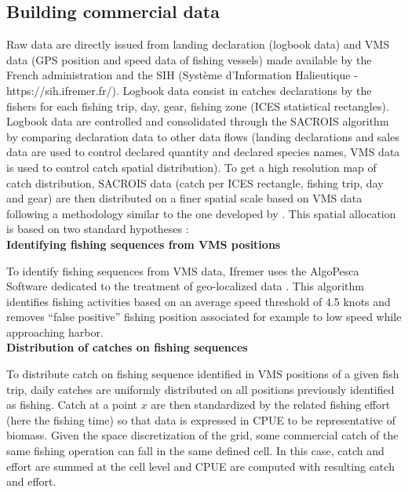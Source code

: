 \clearpage

\subsection{Building commercial data}\label{appendix:DataProcess}

Raw data are directly issued from landing declaration (logbook data) and VMS data (GPS position and speed data of fishing vessels) made available by the French administration and the SIH (Système d’Information Halieutique - https://sih.ifremer.fr/). Logbook data consist in catches declarations by the fishers for each fishing trip, day, gear, fishing zone (ICES statistical rectangles). Logbook data are controlled and consolidated through the SACROIS algorithm \parencite{demaneche-projet-2013} by comparing declaration data to other data flows (landing declarations and sales data are used to control declared quantity and declared species names, VMS data is used to control catch spatial distribution). To get a high resolution map of catch distribution, SACROIS data (catch per ICES rectangle, fishing trip, day and gear) are then distributed on a finer spatial scale based on VMS data following a methodology similar to the one developed by \textcite{hintzen-vmstools-2012}. This spatial allocation is based on two standard hypotheses \parencite{gerritsen-integrating-2011,
murray-effectiveness-2013}: \\

\textbf{Identifying fishing sequences from VMS positions}

To identify fishing sequences from VMS data, Ifremer uses the AlgoPesca Software dedicated to the treatment of geo-localized data \parencite{demaneche-projet-2013}. This algorithm identifies fishing activities based on an average speed threshold of 4.5 knots and removes “false positive” fishing position associated for example to low speed while approaching harbor. \\

\textbf{Distribution of catches on fishing sequences}

To distribute catch on fishing sequence identified in VMS positions of a given fish trip, daily catches are uniformly distributed on all positions previously identified as fishing. Catch at a point \(x\) are then standardized by the related fishing effort (here the fishing time) so that data is expressed in CPUE to be representative of biomass. Given the space discretization of the grid, some commercial catch of the same fishing operation can fall in the same defined cell. In this case, catch and effort are summed at the cell level and CPUE are computed with resulting catch and effort.

